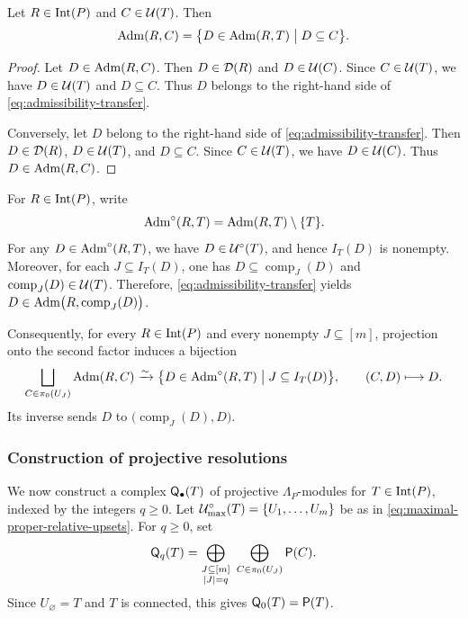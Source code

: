 \begin{lemma}
\label{lem:projective-resolution-admissibility-transfer}
Let $R\in\operatorname{Int}(P)$ and $C\in\mathcal U(T)$. Then
\begin{equation}
\label{eq:admissibility-transfer}
\operatorname{Adm}(R,C)
=
\bigl\{
D\in\operatorname{Adm}(R,T)
\bigm|
D\subseteq C
\bigr\}.
\end{equation}
\end{lemma}

\begin{proof}
Let $D\in\operatorname{Adm}(R,C)$. Then
$D\in\mathcal D(R)$ and $D\in\mathcal U(C)$.
Since $C\in\mathcal U(T)$, we have
$D\in\mathcal U(T)$ and $D\subseteq C$.
Thus $D$ belongs to the right-hand side of
\eqref{eq:admissibility-transfer}.

Conversely, let $D$ belong to the right-hand side of
\eqref{eq:admissibility-transfer}. Then
$D\in\mathcal D(R)$, $D\in\mathcal U(T)$, and $D\subseteq C$.
Since $C\in \mathcal U(T)$, we have $D\in\mathcal U(C)$. Thus $D\in\operatorname{Adm}(R,C)$.
\end{proof}

For $R\in\operatorname{Int}(P)$, write
\begin{equation}
\label{eq:proper-admissible-supports}
\operatorname{Adm}^\circ(R,T)
=
\operatorname{Adm}(R,T)\setminus\{T\}.
\end{equation}
For any $D\in\operatorname{Adm}^\circ(R,T)$, we have $D \in \mathcal U^\circ(T)$, and hence $I_T(D)$ is nonempty.
Moreover, for each $J\subseteq I_T(D)$, one has
$D\subseteq\operatorname{comp}_J(D)$ and
$\operatorname{comp}_J(D)\in\mathcal U(T)$.
Therefore, \eqref{eq:admissibility-transfer} yields
$D\in\operatorname{Adm}\bigl(R,\operatorname{comp}_J(D)\bigr)$.

Consequently, for every $R\in\operatorname{Int}(P)$ and every nonempty
$J\subseteq[m]$, projection onto the second factor induces a bijection
\begin{equation}
\label{eq:admissible-support-component-bijection}
\bigsqcup_{C\in\pi_0(U_J)}
\operatorname{Adm}(R,C)
\xrightarrow{\sim}
\bigl\{
D\in\operatorname{Adm}^\circ(R,T)
\bigm|
J\subseteq I_T(D)
\bigr\},
\qquad
(C,D)\longmapsto D.
\end{equation}
Its inverse sends $D$ to
$\bigl(\operatorname{comp}_J(D),D\bigr)$.

\subsubsection{Construction of projective resolutions}
\label{subsec:projective-resolution-construction}
We now construct a complex $\mathsf Q_\bullet(T)$ of projective
$\Lambda_P$-modules for $T\in\operatorname{Int}(P)$, indexed by the integers
$q\geq0$.  
Let $\mathcal U^\circ_{\max}(T)=\{U_1,\ldots,U_m\}$ be as in
\eqref{eq:maximal-proper-relative-upsets}.
For $q\geq0$, set
\begin{equation}
\label{eq:explicit-projective-terms}
\mathsf Q_q(T)
=
\bigoplus_{\substack{J\subseteq[m]\\ |J|=q}}
\ \bigoplus_{C\in\pi_0(U_J)}
\mathsf P(C).
\end{equation}
Since $U_\varnothing=T$ and $T$ is connected, this gives
$\mathsf Q_0(T)=\mathsf P(T)$.

